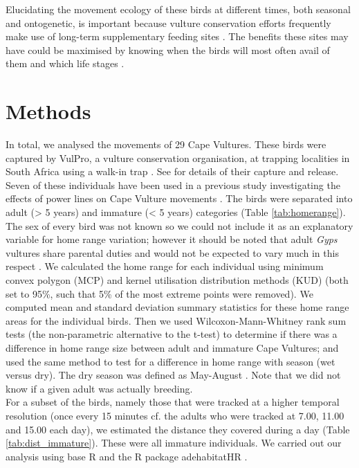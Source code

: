 Elucidating the movement ecology of these birds at different times, both seasonal and ontogenetic, is important because vulture conservation efforts frequently make use of long-term supplementary feeding sites \citep{gilbert2007vulture}. The benefits these sites may have could be maximised by knowing when the birds will most often avail of them and which life stages \citep{monsarrat2013predictability}. 




	
	

\section{\uppercase{M}ethods}
	In total, we analysed the movements of 29 Cape Vultures. These birds were captured by VulPro, a vulture conservation organisation, at trapping localities in South Africa using a walk-in trap \citep{diekmann2004capture,phipps2013power}. See \cite{phipps2013power} for details of their capture and release. Seven of these individuals have been used in a previous study investigating the effects of power lines on Cape Vulture movements \citep{phipps2013power}. The birds were separated into adult (> 5 years) and immature (< 5 years) categories \citep{piper1981estimates} (Table \ref{tab:homerange}). The sex of every bird was not known so we could not include it as an explanatory variable for home range variation; however it should be noted that adult \textit{Gyps} vultures share parental duties and would not be expected to vary much in this respect \citep{houston1976breeding}. 
 We calculated the home range for each individual using minimum convex polygon (MCP) \citep{mohr1947table} and kernel utilisation distribution methods (KUD) (both set to 95\%, such that 5\% of the most extreme points were removed)\citep{worton1989kernel}. We computed mean and standard deviation summary statistics for these home range areas for the individual birds. Then we used Wilcoxon-Mann-Whitney rank sum tests (the non-parametric alternative to the t-test) to determine if there was a difference in home range size between adult and immature Cape Vultures; and used the same method to test for a difference in home range with season (wet versus dry). The dry season was defined as May-August \citep{cooper1988foliage,mundy1992vultures}. Note that we did not know if a given adult was actually breeding. \\
 \indent For a subset of the birds, namely those that were tracked at a higher temporal resolution (once every 15 minutes cf. the adults who were tracked at 7.00, 11.00 and 15.00 each day), we estimated the distance they covered during a day (Table \ref{tab:dist_immature}). These were all immature individuals. We carried out our analysis using base R and the R package adehabitatHR \citep{RCran,calenge2013adehabitathr}. 

